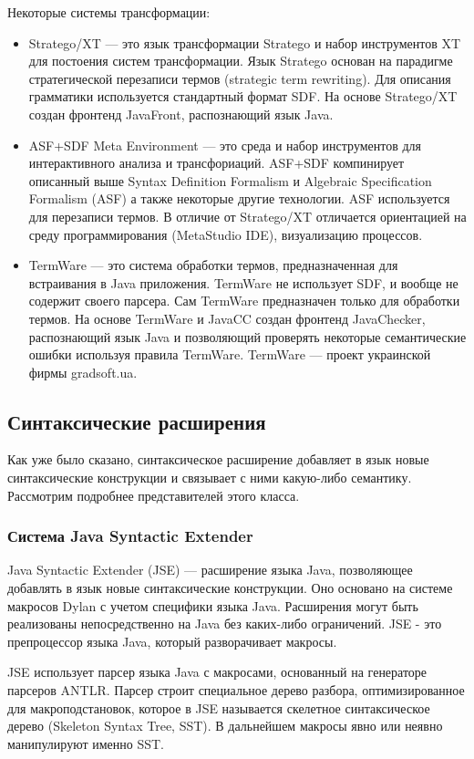 \documentclass[a4paper,12pt,titlepage]{extarticle}
\begin{document}
Некоторые системы трансформации:
\begin{itemize}
  \item Stratego/XT --- это язык трансформации Stratego и набор инструментов 
  XT для постоения систем трансформации. Язык Stratego основан на парадигме
  стратегической перезаписи термов (strategic term rewriting). Для описания
  грамматики используется стандартный формат SDF. На основе Stratego/XT создан
  фронтенд JavaFront, распознающий язык Java.
  \item ASF+SDF Meta Environment --- это среда и набор инструментов для
  интерактивного анализа и трансфориаций. ASF+SDF компинирует описанный
  выше Syntax Definition Formalism и Algebraic Specification Formalism (ASF) а
  также некоторые другие технологии. ASF используется для перезаписи термов.
  В отличие от Stratego/XT отличается ориентацией на среду программирования
  (MetaStudio IDE), визуализацию процессов.
  \item TermWare --- это система обработки термов, предназначенная для
  встраивания в Java приложения. TermWare не использует SDF, и вообще не
  содержит своего парсера. Сам TermWare предназначен только для обработки
  термов. На основе TermWare и JavaCC создан фронтенд JavaChecker, распознающий
  язык Java и позволяющий проверять некоторые семантические ошибки используя
  правила TermWare. TermWare --- проект украинской фирмы gradsoft.ua.
\end{itemize}

\subsection{Синтаксические расширения}
Как уже было сказано, синтаксическое расширение добавляет в язык новые
синтаксические конструкции и связывает с ними какую-либо семантику.
Рассмотрим подробнее представителей этого класса.

\subsubsection*{Система Java Syntactic Extender}
\label{jse}
Java Syntactic Extender (JSE) --- расширение языка Java, позволяющее добавлять в
язык новые синтаксические конструкции. Оно основано на системе макросов Dylan с
учетом специфики языка Java. Расширения могут быть реализованы
непосредственно на Java без каких-либо ограничений. JSE - это
препроцессор языка Java, который разворачивает макросы.

JSE использует парсер языка Java с макросами, основанный на генераторе парсеров
ANTLR. Парсер строит специальное дерево разбора, оптимизированное для
макроподстановок, которое в JSE называется скелетное синтаксическое дерево
(Skeleton Syntax Tree, SST). В дальнейшем макросы явно или неявно манипулируют
именно SST.
\end{document}
